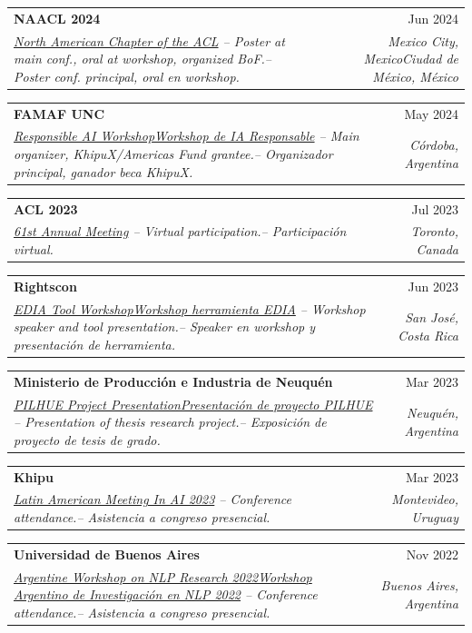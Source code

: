 \documentclass[letterpaper,10pt]{article}
\makeatletter
\newcommand{\lang}[2]{\ifeng #1\else #2\fi}
\def\faExternalLink{\faIcon{external-link-alt}}
\newcommand{\resumeSubheading}[4]{
  \item
    \begin{tabular*}{1.0\textwidth}[t]{l@{\extracolsep{\fill}}r}
      \textbf{#1} & \small #2 \\
      \textit{\small #3} & \textit{\small #4} \\
    \end{tabular*}
}
\makeatother
\begin{document}
    \resumeSubheading{NAACL 2024 \href{https://2024.naacl.org/}{\raisebox{-0.1\height}\faExternalLink}}{Jun 2024}
    {\small \underline{North American Chapter of the ACL} \lang{-- Poster at main conf., oral at workshop, organized BoF.}{-- Poster conf. principal, oral en workshop.}}{\lang{Mexico City, Mexico}{Ciudad de México, México}}

    \resumeSubheading{FAMAF UNC \href{https://famaf.unc.edu.ar/}{\raisebox{-0.1\height}\faExternalLink}}{May 2024}
    {\small \underline{\lang{Responsible AI Workshop}{Workshop de IA Responsable}} \lang{-- Main organizer, KhipuX/Americas Fund grantee.}{-- Organizador principal, ganador beca KhipuX.}}{Córdoba, Argentina}

    \resumeSubheading{ACL 2023 \href{https://2023.aclweb.org/}{\raisebox{-0.1\height}\faExternalLink}}{Jul 2023}
    {\small \underline{61st Annual Meeting} \lang{-- Virtual participation.}{-- Participación virtual.}}{Toronto, Canada}

    \resumeSubheading{Rightscon \href{https://www.vialibre.org.ar/en/workshop-at-rightscon/}{\raisebox{-0.1\height}\faExternalLink}}{Jun 2023}
    {\small \underline{\lang{EDIA Tool Workshop}{Workshop herramienta EDIA}} \lang{-- Workshop speaker and tool presentation.}{-- Speaker en workshop y presentación de herramienta.}}{San José, Costa Rica}

    \resumeSubheading{Ministerio de Producción e Industria de Neuquén \href{https://www.neuqueninforma.gob.ar/inteligencia-artificial-aplicada-a-la-huerta-agroecologica-y-al-compostaje/?fbclid=IwAR0BTbs4tyQs2FSaoP-7I5oXE2KOZoEcTGLar682mSmbxoktTRPn1YLyBa8}{\raisebox{-0.1\height}\faExternalLink}}{Mar 2023}
    {\small \underline{\lang{PILHUE Project Presentation}{Presentación de proyecto PILHUE}} \lang{-- Presentation of thesis research project.}{-- Exposición de proyecto de tesis de grado.}}{Neuquén, Argentina}

    \resumeSubheading{Khipu \href{https://khipu.ai/}{\raisebox{-0.1\height}\faExternalLink}}{Mar 2023}
    {\small \underline{Latin American Meeting In AI 2023} \lang{-- Conference attendance.}{-- Asistencia a congreso presencial.}}{Montevideo, Uruguay}
    
    \resumeSubheading{Universidad de Buenos Aires \href{https://sites.google.com/view/workshop-nlp}{\raisebox{-0.1\height}\faExternalLink}}{Nov 2022}
    {\small \underline{\lang{Argentine Workshop on NLP Research 2022}{Workshop Argentino de Investigación en NLP 2022}} \lang{-- Conference attendance.}{-- Asistencia a congreso presencial.}}{Buenos Aires, Argentina}
\end{document}
